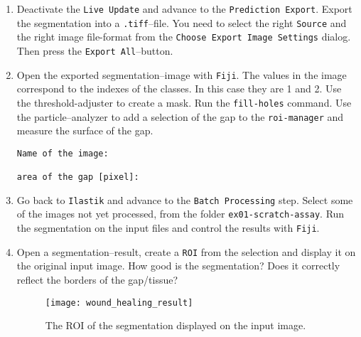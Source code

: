 \begin{enumerate}
\item Deactivate the {\tt Live Update} and advance to the {\tt Prediction Export}. Export the segmentation into a {\tt .tiff}--file. You need to select the right {\tt Source} and the right image file-format from the {\tt Choose Export Image Settings} dialog. Then press the {\tt Export All}--button.

\item Open the exported segmentation--image with {\tt Fiji}. The values in the image correspond to the indexes of the classes. In this case they are 1 and 2. Use the threshold-adjuster to create a mask. Run the {\tt fill-holes} command. Use the particle--analyzer to add a selection of the gap to the {\tt roi-manager} and measure the surface of the gap.
\begin{verbatim}
Name of the image:

area of the gap [pixel]: 
\end{verbatim}
\item Go back to {\tt Ilastik} and advance to the {\tt Batch Processing} step. Select some of the images not yet processed, from the folder {\tt ex01-scratch-assay}. Run the segmentation on the input files and control the results with {\tt Fiji}.

\item Open a segmentation--result, create a {\tt ROI} from the selection and display it on the original input image. How good is the segmentation? Does it correctly reflect the borders of the gap/tissue?
\begin{figure}[!htb]
 \centering
 \texttt{[image: wound\_healing\_result]}
 \caption{The ROI of the segmentation displayed on the input image.}
 \label{figure:ilastik-segmentation-result}
\end{figure}

\end{enumerate}